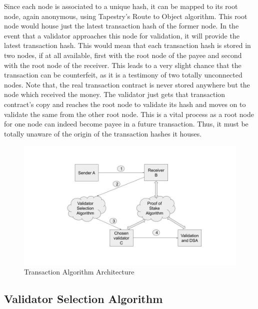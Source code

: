 \documentclass[conference,a4paper,12pt]{IEEEtran}
\begin{document}
	Since each node is associated to a unique hash, it can be mapped to its root node, again anonymous, using Tapestry's Route to Object algorithm. This root node would house just the latest transaction hash of the former node. In the event that a validator approaches this node for validation, it will provide the latest transaction hash. This would mean that each transaction hash is stored in two nodes, if at all available, first with the root node of the payee and second with the root node of the receiver. This leads to a very slight chance that the transaction can be counterfeit, as it is a testimony of two totally unconnected nodes. Note that, the real transaction contract is never stored anywhere but the node which received the money. The validator just gets that transaction contract's copy and reaches the root node to validate its hash and moves on to validate the same from the other root node. This is a vital process as a root node for one node can indeed become payee in a future transaction. Thus, it must be totally unaware of the origin of the transaction hashes it houses.

	\begin{figure}
	  \includegraphics[width=\linewidth]{transaction_algo.jpg}
	  \caption{Transaction Algorithm Architecture}
	  \label{Transaction Architecture}
	\end{figure}

	\subsection{Validator Selection Algorithm}
\end{document}
